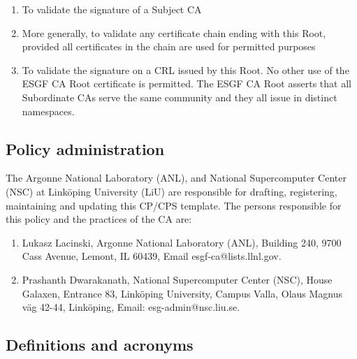 \begin{enumerate}
\item
  
  To validate the signature of a Subject CA
  
\item
  
  More generally, to validate any certificate chain ending with this
  Root, provided all certificates in the chain are used for permitted
  purposes
  
\item
  
  To validate the signature on a CRL issued by this Root. No other use
  of the ESGF CA Root certificate is permitted. The ESGF CA Root
  asserts that all Subordinate CAs serve the same community and they all
  issue in distinct namespaces.
  
\end{enumerate}

\subsection{Policy administration}\label{policy-administration}

The Argonne National Laboratory (ANL), and National Supercomputer Center (NSC) at Link\"oping University (LiU) are responsible for drafting,
registering, maintaining and updating this CP/CPS template. The persons
responsible for this policy and the practices of the CA are: 
\begin{enumerate}
\item Lukasz Lacinski, Argonne National Laboratory (ANL), Building 240, 9700 Cass Avenue, Lemont, IL 60439, Email esgf-ca@lists.llnl.gov.
\item Prashanth Dwarakanath, National Supercomputer Center (NSC), House Galaxen, Entrance 83, Link\"oping University, Campus Valla, Olaus Magnus v\"ag 42-44, Link\"oping, Email: esg-admin@nsc.liu.se.
\end{enumerate}

\subsection{Definitions and acronyms}\label{definitions-and-acronyms}

